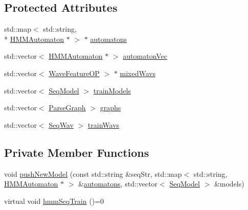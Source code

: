 \subsection*{Protected Attributes}
\begin{DoxyCompactItemize}
\item 
std\+::map$<$ std\+::string, \\*
\hyperlink{class_h_m_m_automaton}{H\+M\+M\+Automaton} $\ast$ $>$ $\ast$ \hyperlink{class_h_m_m_seq_trainer_a70439ad48e64f17d74cdc968effb467f}{automatons}
\item 
std\+::vector$<$ \hyperlink{class_h_m_m_automaton}{H\+M\+M\+Automaton} $\ast$ $>$ \hyperlink{class_h_m_m_seq_trainer_adbd7d13034cdf37f36bc8918f2b2b966}{automaton\+Vec}
\item 
std\+::vector$<$ \hyperlink{class_wave_feature_o_p}{Wave\+Feature\+O\+P} $>$ $\ast$ \hyperlink{class_h_m_m_seq_trainer_a74e6e47e0a794b07e0971cc482ebb5b3}{mixed\+Wavs}
\item 
std\+::vector$<$ \hyperlink{class_seq_model}{Seq\+Model} $>$ \hyperlink{class_h_m_m_seq_trainer_ac8e9e38eaab0a2d2bbb7e4770edc2c60}{train\+Models}
\item 
std\+::vector$<$ \hyperlink{class_parse_graph}{Parse\+Graph} $>$ \hyperlink{class_h_m_m_seq_trainer_a26beb77bab1fd38efa19cd4122f07c01}{graphs}
\item 
std\+::vector$<$ \hyperlink{struct_seq_wav}{Seq\+Wav} $>$ \hyperlink{class_h_m_m_seq_trainer_a290cfb899d17941cb6aba292f1a36e13}{train\+Wavs}
\end{DoxyCompactItemize}
\subsection*{Private Member Functions}
\begin{DoxyCompactItemize}
\item 
void \hyperlink{class_h_m_m_seq_trainer_ac1617cd69e1ca19075428bb4eddf1135}{push\+New\+Model} (const std\+::string \&seq\+Str, std\+::map$<$ std\+::string, \hyperlink{class_h_m_m_automaton}{H\+M\+M\+Automaton} $\ast$ $>$ \&\hyperlink{class_h_m_m_seq_trainer_a70439ad48e64f17d74cdc968effb467f}{automatons}, std\+::vector$<$ \hyperlink{class_seq_model}{Seq\+Model} $>$ \&models)
\item 
virtual void \hyperlink{class_h_m_m_seq_trainer_a72dcee91292fba79b652518b7ea8c8d5}{hmm\+Seq\+Train} ()=0
\end{DoxyCompactItemize}


